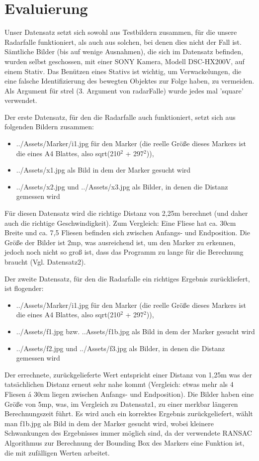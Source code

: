 \documentclass[deutsch]{scrartcl}
\begin{document}
\section{Evaluierung}
Unser Datensatz setzt sich sowohl aus Testbildern zusammen, für die unsere Radarfalle funktioniert, als auch aus solchen, bei denen dies nicht der Fall ist. Sämtliche Bilder (bis auf wenige Ausnahmen), die sich im Datensatz befinden, wurden selbst geschossen, mit einer SONY Kamera, Modell DSC-HX200V, auf einem Stativ. Das Benützen eines Stativs ist wichtig, um Verwackelungen, die eine falsche Identifizierung des bewegten Objektes zur Folge haben, zu vermeiden. Als Argument für strel (3. Argument von radarFalle) wurde jedes mal 'square' verwendet.

Der erste Datensatz, für den die Radarfalle auch funktioniert, setzt sich aus folgenden Bildern zusammen: 
\begin{itemize}
	\item ../Assets/Marker/i1.jpg für den Marker (die reelle Größe dieses Markers ist die eines A4 Blattes, also sqrt(210$^2$ + 297$^2$)), 
	\item ../Assets/x1.jpg als Bild in dem der Marker gesucht wird
	\item ../Assets/x2.jpg und ../Assets/x3.jpg als Bilder, in denen die Distanz gemessen wird
\end{itemize}
Für diesen Datensatz wird die richtige Distanz von 2,25m berechnet (und daher auch die richtige Geschwindigkeit). Zum Vergleich: Eine Fliese hat ca. 30cm Breite und ca. 7,5 Fliesen befinden sich zwischen Anfangs- und Endposition. Die Größe der Bilder ist 2mp, was ausreichend ist, um den Marker zu erkennen, jedoch noch nicht so groß ist, dass das Programm zu lange für die Berechnung braucht (Vgl. Datensatz2).

Der zweite Datensatz, für den die Radarfalle ein richtiges Ergebnis zurückliefert, ist flogender:
\begin{itemize}
	\item ../Assets/Marker/i1.jpg für den Marker (die reelle Größe dieses Markers ist die eines A4 Blattes, also sqrt(210$^2$ + 297$^2$)), 
	\item ../Assets/f1.jpg bzw. ..Assets/f1b.jpg als Bild in dem der Marker gesucht wird
	\item ../Assets/f2.jpg und ../Assets/f3.jpg als Bilder, in denen die Distanz gemessen wird
\end{itemize}
Der errechnete, zurückgelieferte Wert entspricht einer Distanz von 1,25m was der tatsächlichen Distanz erneut sehr nahe kommt (Vergleich: etwas mehr als 4 Fliesen á 30cm liegen zwischen Anfangs- und Endposition). Die Bilder haben eine Größe von 5mp, was, im Vergleich zu Datensatz1, zu einer merkbar längeren Berechnungszeit führt. Es wird auch ein korrektes Ergebnis zurückgeliefert, wählt man f1b.jpg als Bild in dem der Marker gesucht wird, wobei kleinere Schwankungen des Ergebnisses immer möglich sind, da der verwendete RANSAC Algorithmus zur Berechnung der Bounding Box des Markers eine Funktion ist, die mit zufälligen Werten arbeitet.
\end{document}
